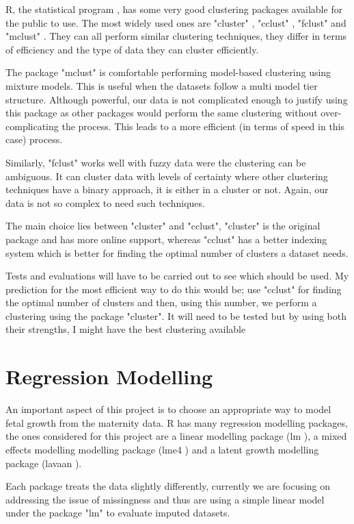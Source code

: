 \documentclass[bsc]{abdnthesis}
\begin{document}
R, the statistical program \cite{R}, has some very good clustering packages available \cite{ cran} for the public to use. The most widely used ones are "cluster" \cite{clust-cluster}, "cclust" \cite{ clust-cclust}, "fclust" \cite{ clust-fclust} and "mclust" \cite{ clust-mclust}. They can all perform similar clustering techniques, they differ in terms of efficiency and the type of data they can cluster efficiently. 

The package "mclust" is comfortable performing model-based clustering using mixture models. This is useful when the datasets follow a multi model tier structure. Although powerful, our data is not complicated enough to justify using this package as other packages would perform the same clustering without over-complicating the process. This leads to a more efficient (in terms of speed in this case) process. 

Similarly, "fclust" works well with fuzzy data were the clustering can be ambiguous. It can cluster data with levels of certainty where other clustering techniques have a binary approach, it is either in a cluster or not. Again, our data is not so complex to need such techniques. 

The main choice lies between "cluster" and "cclust", "cluster" is the original package and has more online support, whereas "cclust" has a better indexing system which is better for finding the optimal number of clusters a dataset needs. 

Tests and evaluations will have to be carried out to see which should be used. My prediction for the most efficient way to do this would be; use "cclust" for finding the optimal number of clusters and then, using this number, we perform a clustering using the package "cluster". It will need to be tested but by using both their strengths, I might have the best clustering available
\section{Regression Modelling} %
\label{sec:regression_modelling}
An important aspect of this project is to choose an appropriate way to model fetal growth from the maternity data. R has many regression modelling packages, the ones considered for this project are a linear modelling package (lm \cite{lm}), a mixed effects modelling modelling package (lme4 \cite{lme4}) and a latent growth modelling package (lavaan \cite{lavaan}). 

Each package treats the data slightly differently, currently we are focusing on addressing the issue of missingness and thus are using a simple linear model under the package "lm" to evaluate imputed datasets. 
\end{document}
